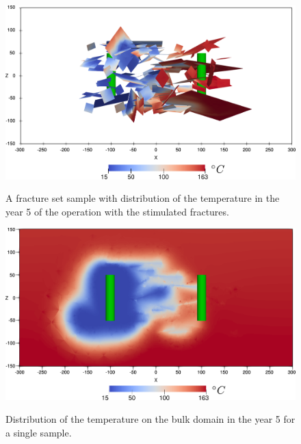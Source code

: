\documentclass{article}
\begin{document}
\begin{figure}
\includegraphics[width=\textwidth]{sample_6_bulk_t5_fr_final.pdf}
\label{fig:fracture_temp}
\caption{A fracture set sample with distribution of the temperature in the year 5 of the operation with the stimulated fractures.}
\end{figure}

\begin{figure}
\includegraphics[width=\textwidth]{sample_6_bulk_t5_final.pdf}
\label{fig:bulk_temp}
\caption{
Distribution of the temperature on the bulk domain in the year 5 for a single sample.}
\end{figure}
\end{document}
